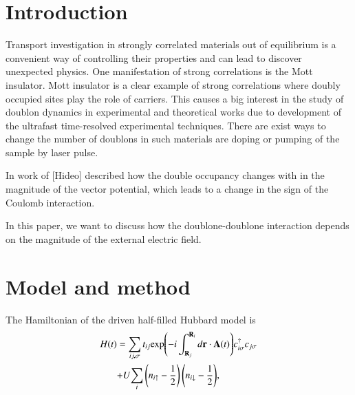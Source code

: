 \tableofcontents
\section{Introduction}

Transport investigation in strongly correlated materials out of equilibrium is a convenient way of controlling their properties and can lead to discover unexpected physics. One manifestation of strong correlations is the Mott insulator.
Mott insulator is a clear example of strong correlations where doubly occupied sites play the role of carriers. This causes a big interest in the study of doublon dynamics in experimental and theoretical works due to development of the ultrafast time-resolved experimental techniques.
There are exist ways to change the number of doublons in such materials are doping or pumping of the sample by laser pulse. 

In work of [Hideo] described how the double occupancy changes with in the magnitude of the vector potential, which leads to a change in the sign of the Coulomb interaction. 

In this paper, we want to discuss how the doublone-doublone interaction depends on the magnitude of the external electric field. 





\FloatBarrier
\section{Model and method}
The Hamiltonian of the driven half-filled Hubbard model is
\begin{equation}
\begin{split}
H(t)&=\sum_{ij,\sigma}t_{ij}{\rm exp}{\left( -i\int_{{\bf R}_{j}}^{{\bf R}_{i}}d{\bf r} \cdot {\bf A}(t) \right)}c_{i \sigma}^{\dagger}c_{j \sigma}\\
&{+U{\sum_{i} \left(n_{i \uparrow}-\frac{1}{2}\right) \left(n_{i \downarrow}-\frac{1}{2} \right)}},
\end{split}
\end{equation}

